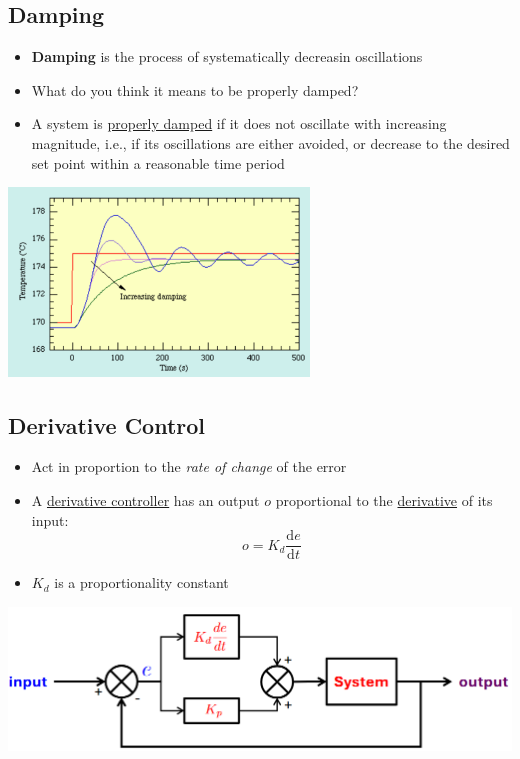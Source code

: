 \documentclass[10pt]{article}
\newcommand{\dd}{\text{d}}
\begin{document}
\subsection*{Damping}
\begin{itemize}
	\item \textbf{Damping} is the process of systematically decreasin oscillations
	\item What do you think it means to be properly damped?
	\item A system is \underline{properly damped} if it does not oscillate with increasing magnitude, i.e., if its oscillations are either avoided, or decrease to the desired set point within a reasonable time period
\end{itemize}
\begin{center} 
	\includegraphics*[width=0.6\textwidth]{L2_12.png} 
\end{center}

\subsection*{Derivative Control}
\begin{itemize}
	\item Act in proportion to the \textit{rate of change} of the error
	\item A \underline{derivative controller} has an output $o$ proportional to the \underline{derivative} of its input:
	\[o = K_d \frac{\dd e}{\dd t}\]
    \item $K_d$ is a proportionality constant
\end{itemize}
\begin{center} 
	\includegraphics*[width=\textwidth]{L2_13.png} 
\end{center}
\end{document}
